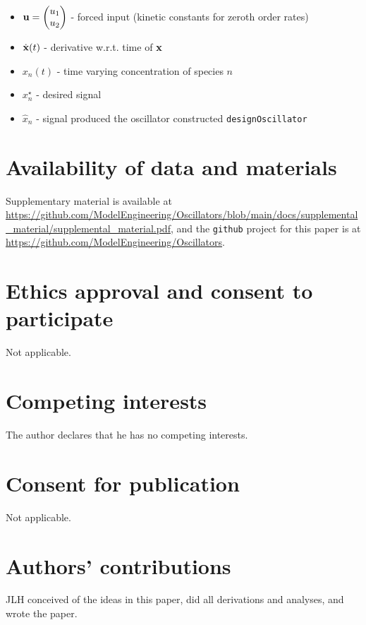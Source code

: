\documentclass{bmcart}
\begin{document}
\begin{backmatter}
\begin{itemize}
\item ${\bf u} = \begin{pmatrix} u_1 \\ u_2 \end{pmatrix}$ - forced input (kinetic constants for zeroth order
rates)
\item $\dot{\bf x} (t)$ - derivative w.r.t. time of ${\bf x}$
\item $x_n(t)$
 - time varying concentration of species $n$
\item $x_n^{\star}$ - desired signal
\item $\hat{x}_n$ - signal produced the oscillator constructed {\tt designOscillator}
\end{itemize}



\section*{Availability of data and materials}%
Supplementary material is available at
\url{https://github.com/ModelEngineering/Oscillators/blob/main/docs/supplemental_material/supplemental_material.pdf}, and the {\tt github} project for this paper is at
\url{https://github.com/ModelEngineering/Oscillators}.


\section*{Ethics approval and consent to participate}
Not applicable.

\section*{Competing interests}
The author declares that he has no competing interests.

\section*{Consent for publication}%
Not applicable.

\section*{Authors' contributions}
JLH conceived of the ideas in this paper, did all derivations and analyses, and wrote the paper.




\end{backmatter}
\end{document}
